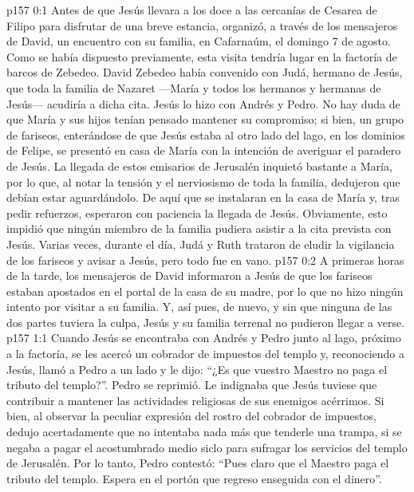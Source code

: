 \author{Comisión de seres intermedios}
\vs p157 0:1 Antes de que Jesús llevara a los doce a las cercanías de Cesarea de Filipo para disfrutar de una breve estancia, organizó, a través de los mensajeros de David, un encuentro con su familia, en Cafarnaúm, el domingo 7 de agosto. Como se había dispuesto previamente, esta visita tendría lugar en la factoría de barcos de Zebedeo. David Zebedeo había convenido con Judá, hermano de Jesús, que toda la familia de Nazaret ---María y todos los hermanos y hermanas de Jesús--- acudiría a dicha cita. Jesús lo hizo con Andrés y Pedro. No hay duda de que María y sus hijos tenían pensado mantener su compromiso; si bien, un grupo de fariseos, enterándose de que Jesús estaba al otro lado del lago, en los dominios de Felipe, se presentó en casa de María con la intención de averiguar el paradero de Jesús. La llegada de estos emisarios de Jerusalén inquietó bastante a María, por lo que, al notar la tensión y el nerviosismo de toda la familia, dedujeron que debían estar aguardándolo. De aquí que se instalaran en la casa de María y, tras pedir refuerzos, esperaron con paciencia la llegada de Jesús. Obviamente, esto impidió que ningún miembro de la familia pudiera asistir a la cita prevista con Jesús. Varias veces, durante el día, Judá y Ruth trataron de eludir la vigilancia de los fariseos y avisar a Jesús, pero todo fue en vano.
\vs p157 0:2 A primeras horas de la tarde, los mensajeros de David informaron a Jesús de que los fariseos estaban apostados en el portal de la casa de su madre, por lo que no hizo ningún intento por visitar a su familia. Y, así pues, de nuevo, y sin que ninguna de las dos partes tuviera la culpa, Jesús y su familia terrenal no pudieron llegar a verse.
\vs p157 1:1 Cuando Jesús se encontraba con Andrés y Pedro junto al lago, próximo a la factoría, se les acercó un cobrador de impuestos del templo y, reconociendo a Jesús, llamó a Pedro a un lado y le dijo: “¿Es que vuestro Maestro no paga el tributo del templo?”. Pedro se reprimió. Le indignaba que Jesús tuviese que contribuir a mantener las actividades religiosas de sus enemigos acérrimos. Si bien, al observar la peculiar expresión del rostro del cobrador de impuestos, dedujo acertadamente que no intentaba nada más que tenderle una trampa, si se negaba a pagar el acostumbrado medio siclo para sufragar los servicios del templo de Jerusalén. Por lo tanto, Pedro contestó: “Pues claro que el Maestro paga el tributo del templo. Espera en el portón que regreso enseguida con el dinero”.
